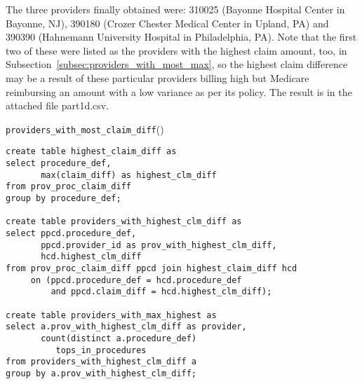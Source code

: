 The three providers finally obtained were: 310025 (Bayonne Hospital Center in Bayonne, NJ), 390180 (Crozer Chester Medical Center in Upland, PA) and 390390 (Hahnemann University Hospital in Philadelphia, PA). Note that the first two of these were listed as the providers with the highest claim amount, too, in Subsection~\ref{subsec:providers_with_most_max}, so the highest claim difference may be a result of these particular providers billing high but Medicare reimbursing an amount with a low variance as per its policy. The result is in the attached file part1d.csv.

\begin{algorithm}
\vspace{-2pt}
\caption{{\sf \texttt{providers\_with\_most\_claim\_diff}}()}
\label{algo:providers_with_most_claim_diff}
\begin{verbatim}
create table highest_claim_diff as
select procedure_def, 
       max(claim_diff) as highest_clm_diff
from prov_proc_claim_diff
group by procedure_def;

create table providers_with_highest_clm_diff as
select ppcd.procedure_def, 
       ppcd.provider_id as prov_with_highest_clm_diff, 
       hcd.highest_clm_diff
from prov_proc_claim_diff ppcd join highest_claim_diff hcd 
     on (ppcd.procedure_def = hcd.procedure_def 
         and ppcd.claim_diff = hcd.highest_clm_diff);

create table providers_with_max_highest as
select a.prov_with_highest_clm_diff as provider, 
       count(distinct a.procedure_def) 
          tops_in_procedures
from providers_with_highest_clm_diff a
group by a.prov_with_highest_clm_diff;
\end{verbatim}
\end{algorithm}
 

